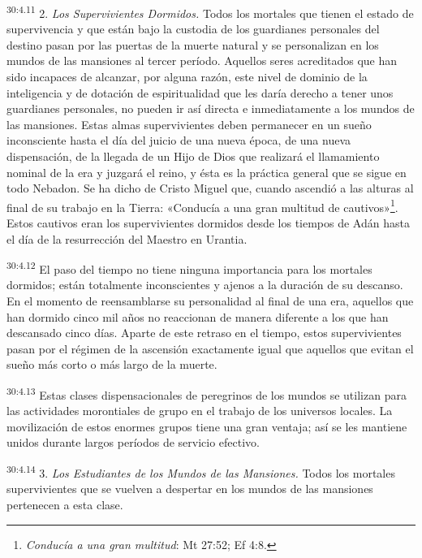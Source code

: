 \par
\textsuperscript{30:4.11} 2. \textit{Los Supervivientes Dormidos.} Todos los mortales que tienen el estado de supervivencia y que están bajo la custodia de los guardianes personales del destino pasan por las puertas de la muerte natural y se personalizan en los mundos de las mansiones al tercer período. Aquellos seres acreditados que han sido incapaces de alcanzar, por alguna razón, este nivel de dominio de la inteligencia y de dotación de espiritualidad que les daría derecho a tener unos guardianes personales, no pueden ir así directa e inmediatamente a los mundos de las mansiones. Estas almas supervivientes deben permanecer en un sueño inconsciente hasta el día del juicio de una nueva época, de una nueva dispensación, de la llegada de un Hijo de Dios que realizará el llamamiento nominal de la era y juzgará el reino, y ésta es la práctica general que se sigue en todo Nebadon. Se ha dicho de Cristo Miguel que, cuando ascendió a las alturas al final de su trabajo en la Tierra: «Conducía a una gran multitud de cautivos»\footnote{\textit{Conducía a una gran multitud}: Mt 27:52; Ef 4:8.}. Estos cautivos eran los supervivientes dormidos desde los tiempos de Adán hasta el día de la resurrección del Maestro en Urantia.

\par
\textsuperscript{30:4.12} El paso del tiempo no tiene ninguna importancia para los mortales dormidos; están totalmente inconscientes y ajenos a la duración de su descanso. En el momento de reensamblarse su personalidad al final de una era, aquellos que han dormido cinco mil años no reaccionan de manera diferente a los que han descansado cinco días. Aparte de este retraso en el tiempo, estos supervivientes pasan por el régimen de la ascensión exactamente igual que aquellos que evitan el sueño más corto o más largo de la muerte.

\par
\textsuperscript{30:4.13} Estas clases dispensacionales de peregrinos de los mundos se utilizan para las actividades morontiales de grupo en el trabajo de los universos locales. La movilización de estos enormes grupos tiene una gran ventaja; así se les mantiene unidos durante largos períodos de servicio efectivo.

\par
\textsuperscript{30:4.14} 3. \textit{Los Estudiantes de los Mundos de las Mansiones.} Todos los mortales supervivientes que se vuelven a despertar en los mundos de las mansiones pertenecen a esta clase.

